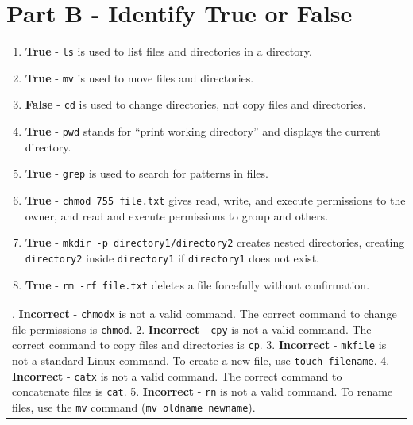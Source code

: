 \section{Part B - Identify True or
False}\label{part-b---identify-true-or-false}

\begin{enumerate}
\def\labelenumi{\arabic{enumi}.}
\tightlist
\item
  \textbf{True} - \texttt{ls} is used to list files and directories in a
  directory.
\item
  \textbf{True} - \texttt{mv} is used to move files and directories.
\item
  \textbf{False} - \texttt{cd} is used to change directories, not copy
  files and directories.
\item
  \textbf{True} - \texttt{pwd} stands for ``print working directory''
  and displays the current directory.
\item
  \textbf{True} - \texttt{grep} is used to search for patterns in files.
\item
  \textbf{True} - \texttt{chmod\ 755\ file.txt} gives read, write, and
  execute permissions to the owner, and read and execute permissions to
  group and others.
\item
  \textbf{True} - \texttt{mkdir\ -p\ directory1/directory2} creates
  nested directories, creating \texttt{directory2} inside
  \texttt{directory1} if \texttt{directory1} does not exist.
\item
  \textbf{True} - \texttt{rm\ -rf\ file.txt} deletes a file forcefully
  without confirmation.
\end{enumerate}

\begin{longtable}[]{@{}
  >{\raggedright\arraybackslash}p{}@{}}
\toprule\noalign{}
\endhead
\bottomrule\noalign{}
\endlastfoot
1. \textbf{Incorrect} - \texttt{chmodx} is not a valid command. The
correct command to change file permissions is \texttt{chmod}. 2.
\textbf{Incorrect} - \texttt{cpy} is not a valid command. The correct
command to copy files and directories is \texttt{cp}. 3.
\textbf{Incorrect} - \texttt{mkfile} is not a standard Linux command. To
create a new file, use \texttt{touch\ filename}. 4. \textbf{Incorrect} -
\texttt{catx} is not a valid command. The correct command to concatenate
files is \texttt{cat}. 5. \textbf{Incorrect} - \texttt{rn} is not a
valid command. To rename files, use the \texttt{mv} command
(\texttt{mv\ oldname\ newname}). \\
\end{longtable}

